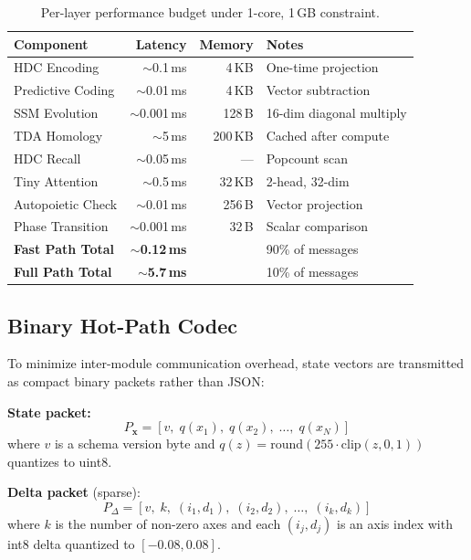 \documentclass[10pt,twocolumn]{article}
\begin{document}
\begin{table}[h]
\centering
\scriptsize
\begin{tabular}{lrrl}
\toprule
\textbf{Component} & \textbf{Latency} & \textbf{Memory} & \textbf{Notes} \\
\midrule
HDC Encoding & $\sim$0.1\,ms & 4\,KB & One-time projection \\
Predictive Coding & $\sim$0.01\,ms & 4\,KB & Vector subtraction \\
SSM Evolution & $\sim$0.001\,ms & 128\,B & 16-dim diagonal multiply \\
TDA Homology & $\sim$5\,ms & 200\,KB & Cached after compute \\
HDC Recall & $\sim$0.05\,ms & --- & Popcount scan \\
Tiny Attention & $\sim$0.5\,ms & 32\,KB & 2-head, 32-dim \\
Autopoietic Check & $\sim$0.01\,ms & 256\,B & Vector projection \\
Phase Transition & $\sim$0.001\,ms & 32\,B & Scalar comparison \\
\midrule
\textbf{Fast Path Total} & $\sim$\textbf{0.12\,ms} & & 90\% of messages \\
\textbf{Full Path Total} & $\sim$\textbf{5.7\,ms} & & 10\% of messages \\
\bottomrule
\end{tabular}
\caption{Per-layer performance budget under 1-core, 1\,GB constraint.}
\label{tab:performance}
\end{table}

\subsection{Binary Hot-Path Codec}

To minimize inter-module communication overhead, state vectors are transmitted as compact binary packets rather than JSON:

\textbf{State packet:}
\begin{equation}
P_{\mathbf{x}} = [v,\; q(x_1),\; q(x_2),\; \ldots,\; q(x_N)]
\end{equation}
where $v$ is a schema version byte and $q(z) = \text{round}(255 \cdot \text{clip}(z, 0, 1))$ quantizes to uint8.

\textbf{Delta packet} (sparse):
\begin{equation}
P_\Delta = [v,\; k,\; (i_1, d_1),\; (i_2, d_2),\; \ldots,\; (i_k, d_k)]
\end{equation}
where $k$ is the number of non-zero axes and each $(i_j, d_j)$ is an axis index with int8 delta quantized to $[-0.08, 0.08]$.
\end{document}
